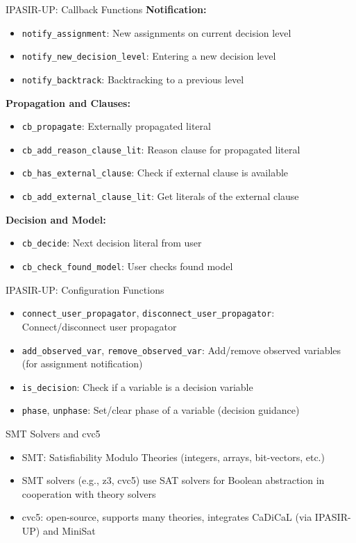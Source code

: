 \documentclass{beamer}
\newcommand*{\code}[1]{\lstinline[basicstyle=\ttfamily, breaklines]|#1|}
\begin{document}
\begin{frame}{IPASIR-UP: Callback Functions}
  \textbf{Notification:}
  \begin{itemize}
    \item \code{notify_assignment}: New assignments on current decision level
    \item \code{notify_new_decision_level}: Entering a new decision level
    \item \code{notify_backtrack}: Backtracking to a previous level
  \end{itemize}
  \textbf{Propagation and Clauses:}
  \begin{itemize}
    \item \code{cb_propagate}: Externally propagated literal
    \item \code{cb_add_reason_clause_lit}: Reason clause for propagated literal
    \item \code{cb_has_external_clause}: Check if external clause is available
    \item \code{cb_add_external_clause_lit}: Get literals of the external clause
  \end{itemize}
  \textbf{Decision and Model:}
  \begin{itemize}
    \item \code{cb_decide}: Next decision literal from user
    \item \code{cb_check_found_model}: User checks found model
  \end{itemize}
\end{frame}

\begin{frame}{IPASIR-UP: Configuration Functions}
  \begin{itemize}
    \item \code{connect_user_propagator}, \code{disconnect_user_propagator}: Connect/disconnect user propagator
    \item \code{add_observed_var}, \code{remove_observed_var}: Add/remove observed variables (for assignment notification)
    \item \code{is_decision}: Check if a variable is a decision variable
    \item \code{phase}, \code{unphase}: Set/clear phase of a variable (decision guidance)
  \end{itemize}
\end{frame}

\begin{frame}{SMT Solvers and cvc5}
  \begin{itemize}
    \item SMT: Satisfiability Modulo Theories (integers, arrays, bit-vectors, etc.)
    \item SMT solvers (e.g., z3, cvc5) use SAT solvers for Boolean abstraction in cooperation with theory solvers
    \item cvc5: open-source, supports many theories, integrates CaDiCaL (via IPASIR-UP) and MiniSat
  \end{itemize}
\end{frame}
\end{document}
